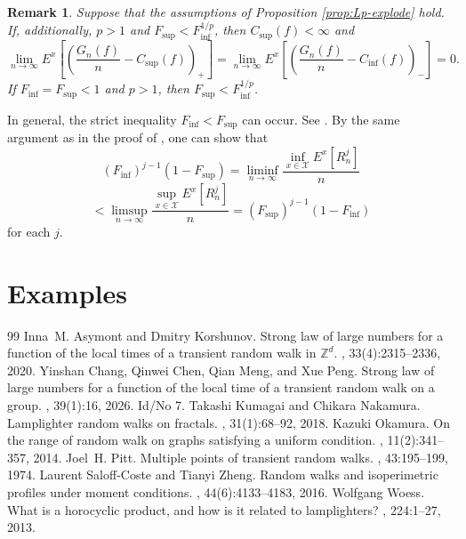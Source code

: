 \documentclass[10pt,a4paper]{amsart}
\newtheorem{Rem}[Thm]{Remark}
\begin{document}
\begin{Rem}
Suppose that the assumptions of Proposition \ref{prop:Lp-explode} hold. 
If, additionally, $p > 1$ and $F_{\sup} < F_{\inf}^{1/p}$, 
then $C_{\sup}(f) < \infty$ and 
\[ \lim_{n \to \infty} E^x \left[ \left( \frac{G_n (f)}{n} - C_{\sup}(f) \right)_{+} \right] =  \lim_{n \to \infty} E^x \left[ \left( \frac{G_n (f)}{n} - C_{\inf}(f) \right)_{-} \right] = 0. \] 
If $F_{\inf} = F_{\sup} < 1$ and $p >1$,  then $F_{\sup} < F_{\inf}^{1/p}$. 
\end{Rem}

In general, the strict inequality $F_{\inf} < F_{\sup}$ can occur. 
See \cite[Theorem 1.3]{Okamura2014}. 
By the same argument as in the proof of  \cite[Theorem 1.3]{Okamura2014}, 
one can show that 
\[ (F_{\inf})^{j-1} (1-F_{\sup}) =  \liminf_{n \to \infty} \frac{\inf_{x \in \mathcal{X}} E^{x} \left[R_n^j \right]}{n} \]
\[ < \limsup_{n \to \infty} \frac{\sup_{x \in \mathcal{X}} E^{x} \left[R_n^j \right]}{n} = (F_{\sup})^{j-1} (1-F_{\inf}) \]
for each $j$. 


\section{Examples}\label{sec:examples}


\begin{thebibliography}{99}
 Inna~M. Asymont and Dmitry Korshunov. \newblock Strong law of large numbers for a function of the local times of a transient random walk in {{\({\mathbb{Z}}^d\)}}. , 33(4):2315--2336, 2020.
 Yinshan Chang, Qinwei Chen, Qian Meng, and Xue Peng. \newblock Strong law of large numbers for a function of the local time of a transient random walk on a group. , 39(1):16, 2026. \newblock Id/No 7.
 Takashi Kumagai and Chikara Nakamura. \newblock Lamplighter random walks on fractals. , 31(1):68--92, 2018.
 Kazuki Okamura. \newblock On the range of random walk on graphs satisfying a uniform condition. , 11(2):341--357, 2014.
 Joel~H. Pitt. \newblock Multiple points of transient random walks. , 43:195--199, 1974.
 Laurent Saloff-Coste and Tianyi Zheng. \newblock Random walks and isoperimetric profiles under moment conditions. , 44(6):4133--4183, 2016.
 Wolfgang Woess. \newblock What is a horocyclic product, and how is it related to lamplighters? , 224:1--27, 2013.
\end{thebibliography}
\end{document}
